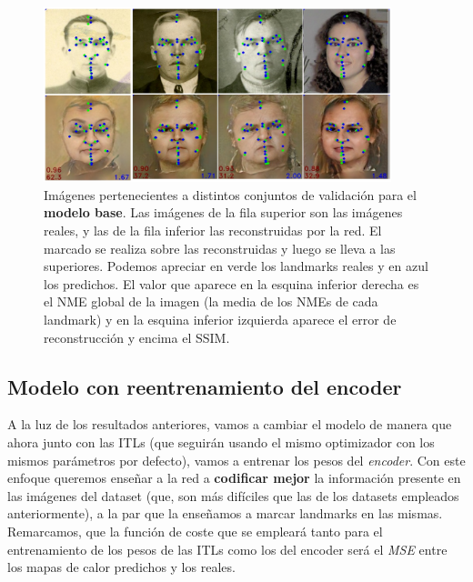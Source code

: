        \begin{figure}[H]
            \centering
            \includegraphics[width=0.9\textwidth]{img/image_basemodel.png}
            \caption{Imágenes pertenecientes a distintos conjuntos de validación para el \textbf{modelo base}. Las imágenes de la fila superior son las imágenes reales, y las de la fila inferior las reconstruidas por la red. El marcado se realiza sobre las reconstruidas y luego se lleva a las superiores. Podemos apreciar en verde los landmarks reales y  en azul los predichos. El valor que aparece en la esquina inferior derecha es el NME global de la imagen (la media de los NMEs de cada landmark) y en la esquina inferior izquierda aparece el error de reconstrucción y encima el SSIM.}
            \label{fig:Ejemplo_ModelBase}
        \end{figure}

    \subsection{Modelo con reentrenamiento del encoder}
        \noindent A la luz de los resultados anteriores, vamos a cambiar el modelo de manera que ahora junto con las ITLs (que seguirán usando el mismo optimizador con los mismos parámetros por defecto), vamos a entrenar los pesos del \textit{encoder}. Con este enfoque queremos enseñar a la red a \textbf{codificar mejor} la información presente en las imágenes del dataset (que, son más difíciles que las de los datasets empleados anteriormente), a la par que la enseñamos a marcar landmarks en las mismas. Remarcamos, que la función de coste que se empleará tanto para el entrenamiento de los pesos de las ITLs como los del encoder será el \textit{MSE} entre los mapas de calor predichos y los reales.

        \medskip

